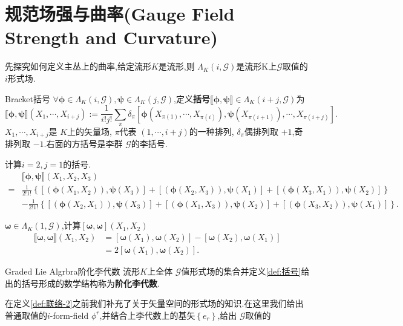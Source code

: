 \documentclass[../main.tex]{subfiles}
\begin{document}
\chapter{规范场强与曲率(Gauge Field Strength and Curvature)}
先探究如何定义主丛上的曲率,给定流形$K$是流形,则 $\Lambda_K(i,\mathscr{G})$是流形K上$\mathscr{G}$取值的$i$形式场.
\begin{definition}
  {Bracket}{括号}
  $\forall \bm{\phi} \in \Lambda_K(i,\mathscr{G}),\bm{\psi}\in \Lambda_K(j,\mathscr{G})$,定义\textbf{括号}$\llbracket   \bm{\phi},\bm{\psi}\rrbracket \in \Lambda_K(i+j,\mathscr{G})$为\[
    \llbracket\bm{\phi},\bm{\psi}\rrbracket(X_1,\cdots ,X_{i+j}) := \frac{1}{i!j!}\sum_\pi \delta_\pi[\bm{\phi}(X_{\pi(1)},\cdots ,X_{\pi(i)}),\bm{\psi}(X_{\pi(i+1)}),\cdots,X_{\pi(i+j)}]
  .\] 
  $X_1,\cdots,X_{i+j}$是 $K$上的矢量场, $\pi$代表 $(1,\cdots,i+j)$的一种排列, $\delta_\pi$偶排列取 $+1$,奇排列取 $-1$.右面的方括号是李群 $\mathscr{G}$的李括号.
\end{definition}
\begin{example}
  \label{ex:I-8-1}
  计算$i = 2,j = 1$的括号.
\begin{align*}
  &\llbracket\bm{\phi},\bm{\psi}\rrbracket (X_1,X_2 ,X_3) \\
  = &  \frac{1}{2!1!} \left\{ [(\bm{\phi}(X_1,X_2)),\bm{\psi}(X_3) ]+[(\bm{\phi}(X_2,X_3)),\bm{\psi}(X_1) ]+[(\bm{\phi}(X_3,X_1)),\bm{\psi}(X_2) ] \right\} \\
   & - \frac{1}{2!1!} \left\{ [(\bm{\phi}(X_2,X_1)),\bm{\psi}(X_3) ]+[(\bm{\phi}(X_1,X_3)),\bm{\psi}(X_2) ]+[(\bm{\phi}(X_3,X_2)),\bm{\psi}(X_1) ] \right\} 
.\end{align*}
\end{example}
\begin{example}
  \label{ex:I-8-2}
  $\bm{\omega} \in \Lambda_K(1,\mathscr{G}) $,计算$[\bm{\omega},\bm{\omega}](X_1,X_2)  $
\begin{align*}
  \llbracket \bm{\omega},\bm{\omega}\rrbracket(X_1,X_2)& = [\bm{\omega}(X_1),\bm{\omega}(X_2)  ] -[\bm{\omega}(X_2),\bm{\omega}(X_1)  ] \\
                                    & = 2[\bm{\omega}(X_1),\bm{\omega}(X_2)  ]
.\end{align*}
\end{example}
\begin{definition}
  {Graded Lie Algrbra}{阶化李代数}
  流形$K$上全体 $\mathscr{G}$值形式场的集合并定义\ref{def:括号}给出的括号形成的数学结构称为\textbf{阶化李代数}.
\end{definition}
在定义\ref{def:联络-2}之前我们补充了关于矢量空间的形式场的知识.在这里我们给出普通取值的$i$-form-field $\phi^r$,并结合上李代数上的基矢$\left\{ e_r \right\} $,给出 $\mathscr{G}$取值的
\end{document}
